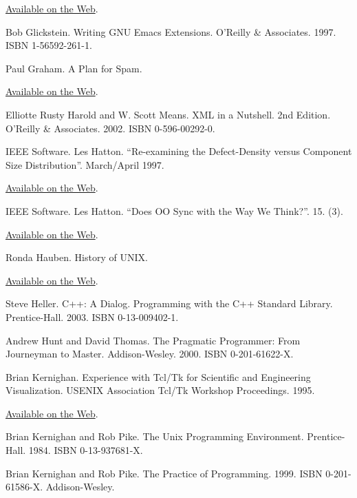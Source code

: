 \documentclass[12pt,oneside]{book}
\begin{document}
\begin{thebibliography}{9}
\href{http://freshmeat.net/articles/view/122/}{Available on the Web}.

 Bob Glickstein. Writing GNU Emacs Extensions. O'Reilly \&{} Associates. 1997. ISBN 1-56592-261-1.

 Paul Graham. A Plan for Spam.

\href{http://www.paulgraham.com/spam.html}{Available on the Web}.

 Elliotte Rusty Harold and W. Scott Means. XML in a Nutshell. 2nd Edition. O'Reilly \&{} Associates. 2002. ISBN 0-596-00292-0.

 IEEE Software. Les Hatton. “Re-examining the Defect-Density versus Component Size Distribution”. March/April 1997.

\href{http://www.cs.ukc.ac.uk/people/staff/lh8/pubs/pubis697/Ubend_IS697.pdf.gz}{Available on the Web}.

 IEEE Software. Les Hatton. “Does OO Sync with the Way We Think?”. 15. (3).

\href{http://www.cs.ukc.ac.uk/people/staff/lh8/pubs/pubis698/OO_IS698.pdf.gz}{Available on the Web}.

 Ronda Hauben. History of UNIX.

\href{http://www.dei.isep.ipp.pt/docs/unix.html}{Available on the Web}.

 Steve Heller. C++: A Dialog. Programming with the C++ Standard Library. Prentice-Hall. 2003. ISBN 0-13-009402-1.

 Andrew Hunt and David Thomas. The Pragmatic Programmer: From Journeyman to Master. Addison-Wesley. 2000. ISBN 0-201-61622-X.

 Brian Kernighan. Experience with Tcl/Tk for Scientific and Engineering Visualization. USENIX Association Tcl/Tk Workshop Proceedings. 1995.

\href{http://www.usenix.org/publications/library/proceedings/tcl95/full_papers/kernighan.txt}{Available on the Web}.

 Brian Kernighan and Rob Pike. The Unix Programming Environment. Prentice-Hall. 1984. ISBN 0-13-937681-X.

 Brian Kernighan and Rob Pike. The Practice of Programming. 1999. ISBN 0-201-61586-X. Addison-Wesley.


\end{thebibliography}
\end{document}
